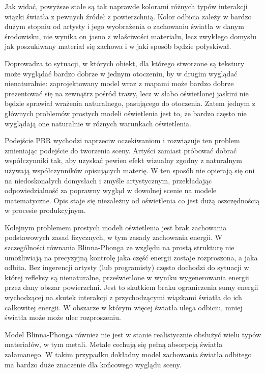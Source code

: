 \documentclass[../main.tex]{subfiles}
\begin{document}
Jak widać, powyższe stałe są tak naprawde kolorami różnych typów interakcji
wiązki światła z pewnych źródeł z powierzchnią. Kolor odbicia zależy w bardzo
dużym stopniu od artysty i jego wyobrażenia o zachowaniu światła w danym
środowisku, nie wynika on jasno z właściwości materiału, lecz zwykłego domysłu
jak poszukiwany materiał się zachowa i w jaki sposób będzie połyskiwał.

Doprowadza to sytuacji, w których obiekt, dla którego stworzone są tekstury
może wyglądać bardzo dobrze w jednym otoczeniu, by w drugim wyglądać
nienaturalnie: zaprojektowany model wraz z mapami może bardzo dobrze
prezentować się na zewnątrz pośród trawy, lecz w słabo oświetlonej jaskini nie
będzie sprawiał wrażenia naturalnego, pasującego do otoczenia. Zatem jednym z
głównych problemów prostych modeli oświetlenia jest to, że bardzo często nie
wyglądają one naturalnie w różnych warunkach oświetlenia.

Podejście PBR wychodzi naprzeciw oczekiwaniom i rozwiązuje ten problem
zmieniając podejście do tworzenia sceny. Artyści zamiast próbować dobrać
współczynniki tak, aby uzyskać pewien efekt wizualny zgodny z naturalnym
używają współczynników opisujących materię. W ten sposób nie opierają się oni
na niedoskonałych domysłach i zmyśle artystycznym, przekładając
odpowiedzialność za poprawny wygląd w dowolnej scenie na modele matematyczne.
Opis staje się niezależny od oświetlenia co jest dużą oszczędnością w procesie
produkcyjnym.

Kolejnym problemem prostych modeli oświetlenia jest brak zachowania
podstawowych zasad fizycznych, w tym zasady zachowania energii. W szczególności
równania Blinna-Phonga ze względu na prostą strukturę nie umożliwiają na
precyzyjną kontrolę jaka część energii zostaje rozproszona, a jaka odbita. Bez
ingerencji artysty (lub programisty) często dochodzi do sytuacji w której
refleksy są nienaturalne, prześwietlone w wyniku wygenerowania energii przez
dany obszar powierzchni. Jest to skutkiem braku ograniczenia sumy energii
wychodzącej na skutek interakcji z przychodzącymi wiązkami światła do ich
całkowitej energii. W obszarze w którym więcej światła ulega odbiciu, mniej
światła może może ulec rozproszeniu.

Model Blinna-Phonga również nie jest w stanie realistycznie obsłużyć wielu
typów materiałów, w tym metali. Metale cechują się pełną absorpcją światła
załamanego. W takim przypadku dokładny model zachowania światła odbitego ma
bardzo duże znaczenie dla końcowego wyglądu sceny.
\end{document}

